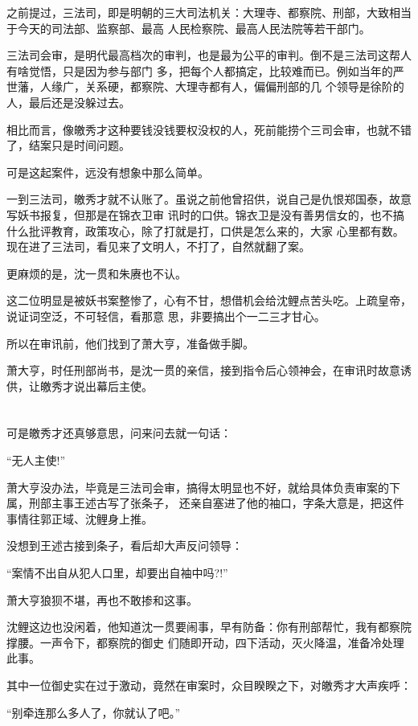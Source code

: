 \documentclass[11pt,a4paper,onecolumn]{article}
\begin{document}
之前提过，三法司，即是明朝的三大司法机关：大理寺、都察院、刑部，大致相当于今天的司法部、监察部、最高
人民检察院、最高人民法院等若干部门。

三法司会审，是明代最高档次的审判，也是最为公平的审判。倒不是三法司这帮人有啥觉悟，只是因为参与部门
多，把每个人都搞定，比较难而已。例如当年的严世藩，人缘广，关系硬，都察院、大理寺都有人，偏偏刑部的几
个领导是徐阶的人，最后还是没躲过去。

相比而言，像皦秀才这种要钱没钱要权没权的人，死前能捞个三司会审，也就不错了，结案只是时间问题。

可是这起案件，远没有想象中那么简单。

一到三法司，皦秀才就不认账了。虽说之前他曾招供，说自己是仇恨郑国泰，故意写妖书报复，但那是在锦衣卫审
讯时的口供。锦衣卫是没有善男信女的，也不搞什么批评教育，政策攻心，除了打就是打，口供是怎么来的，大家
心里都有数。现在进了三法司，看见来了文明人，不打了，自然就翻了案。

更麻烦的是，沈一贯和朱赓也不认。

这二位明显是被妖书案整惨了，心有不甘，想借机会给沈鲤点苦头吃。上疏皇帝，说证词空泛，不可轻信，看那意
思，非要搞出个一二三才甘心。

所以在审讯前，他们找到了萧大亨，准备做手脚。

萧大亨，时任刑部尚书，是沈一贯的亲信，接到指令后心领神会，在审讯时故意诱供，让皦秀才说出幕后主使。

\section[\thesection]{}

可是皦秀才还真够意思，问来问去就一句话：

``无人主使!''

萧大亨没办法，毕竟是三法司会审，搞得太明显也不好，就给具体负责审案的下属，刑部主事王述古写了张条子，
还亲自塞进了他的袖口，字条大意是，把这件事情往郭正域、沈鲤身上推。

没想到王述古接到条子，看后却大声反问领导：

``案情不出自从犯人口里，却要出自袖中吗?!''

萧大亨狼狈不堪，再也不敢掺和这事。

沈鲤这边也没闲着，他知道沈一贯要闹事，早有防备：你有刑部帮忙，我有都察院撑腰。一声令下，都察院的御史
们随即开动，四下活动，灭火降温，准备冷处理此事。

其中一位御史实在过于激动，竟然在审案时，众目睽睽之下，对皦秀才大声疾呼：

``别牵连那么多人了，你就认了吧。''
\end{document}

